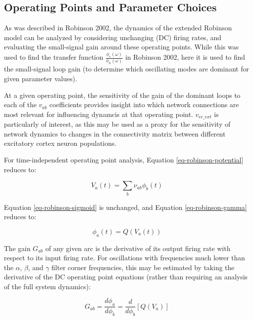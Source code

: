 \subsection{Operating Points and Parameter Choices}
\label{sect-robinson-math-fixed}

As was described in Robinson 2002, the dynamics of the extended Robinson
model can be analyzed by considering unchanging (DC) firing rates, and
evaluating the small-signal gain around these operating points. While this
was used to find the transfer function
$\frac{\phi_e(\omega)}{\phi_n(\omega)}$ in Robinson 2002, here it is used
to find the small-signal loop gain (to determine which oscillating modes
are dominant for given parameter values).

At a given operating point, the sensitivity of the gain of the dominant
loops to each of the $v_{ab}$ coefficients provides insight into which
network connections are most relevant for influencing dynamcis at that
operating point. $v_{ee\_ext}$ is particularly of interest, as this
may be used as a proxy for the sensitivity of network dynamics to changes
in the connectivity matrix between different excitatory cortex neuron
populations.

For time-independent operating point analysis, Equation
\ref{eq-robinson-potential} reduces to:

\begin{equation}
V_a(t) = \sum_b \nu_{ab} \phi_b(t)
\label{eq-robinson-dc-potential}
\end{equation}

Equation \ref{eq-robinson-sigmoid} is unchanged, and Equation
\ref{eq-robinson-gamma} reduces to:

\begin{equation}
\phi_a(t) = Q(V_a(t))
\label{eq-robinson-dc-nogamma}
\end{equation}

The gain $G_{ab}$ of any given arc is the derivative of its output firing
rate with respect to its input firing rate. For oscillations with
frequencies much lower than the $\alpha$, $\beta$, and $\gamma$ filter
corner frequencies, this may be estimated by taking the derivative of the
DC operating point equations (rather than requiring an analysis of the full
system dynamics):

\begin{equation}
G_{ab} = \frac{d\phi_a}{d\phi_b} = \frac{d}{d\phi_b} \left [ Q(V_a) \right ]
\end{equation}


